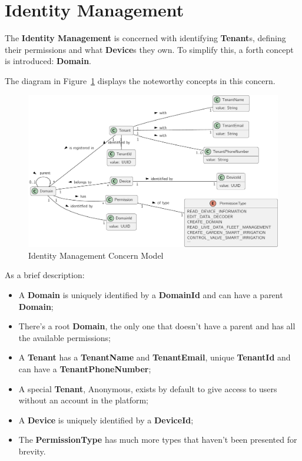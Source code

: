 \section{Identity Management}
\label{subsubsec:design:domain:bounded_contexts:identity}

The \textbf{Identity Management} is concerned with identifying \textbf{Tenant}s, defining their permissions and what \textbf{Device}s they own.
To simplify this, a forth concept is introduced: \textbf{Domain}.

The diagram in Figure~\ref{fig:design:domain:bounded_contexts:identity:diagram} displays the noteworthy concepts in this concern.

\begin{figure}[H]
   \centering
  \includegraphics[page=1,width=\columnwidth]{assets/diagrams/design/domain/identity-management-model.pdf}
  \caption[Identity Management Concern Model]{Identity Management Concern Model}
  \label{fig:design:domain:bounded_contexts:identity:diagram}
\end{figure}

As a brief description:

\begin{itemize}
   \item A \textbf{Domain} is uniquely identified by a \textbf{DomainId} and can have a parent \textbf{Domain};
   \item There's a root \textbf{Domain}, the only one that doesn't have a parent and has all the available permissions;
   \item A \textbf{Tenant} has a \textbf{TenantName} and \textbf{TenantEmail}, unique \textbf{TenantId} and can have a \textbf{TenantPhoneNumber};
   \item A special \textbf{Tenant}, Anonymous, exists by default to give access to users without an account in the platform;
   \item A \textbf{Device} is uniquely identified by a \textbf{DeviceId};
   \item The \textbf{PermissionType} has much more types that haven't been presented for brevity.
\end{itemize}

